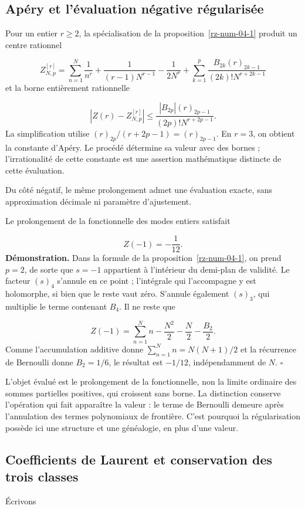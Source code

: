 \subsection{Apéry et l’évaluation négative régularisée}
Pour un entier \(r\geq2\), la spécialisation de la proposition~\ref{rz-num-04-1} produit un centre rationnel

\[
Z_{N,p}^{[r]}=
\sum_{n=1}^N\frac1{n^r}+\frac1{(r-1)N^{r-1}}-\frac1{2N^r}
+\sum_{k=1}^p\frac{B_{2k}(r)_{2k-1}}{(2k)!N^{r+2k-1}}
\]
et la borne entièrement rationnelle

\[
\left|Z(r)-Z_{N,p}^{[r]}\right|
\leq\frac{|B_{2p}|(r)_{2p-1}}{(2p)!N^{r+2p-1}}.
\]
La simplification utilise \((r)_{2p}/(r+2p-1)=(r)_{2p-1}\). En \(r=3\), on obtient la constante d’Apéry. Le procédé détermine sa valeur avec des bornes ; l’irrationalité de cette constante est une assertion mathématique distincte de cette évaluation.

Du côté négatif, le même prolongement admet une évaluation exacte, sans approximation décimale ni paramètre d’ajustement.

Le prolongement de la fonctionnelle des modes entiers satisfait

\[
Z(-1)=-\frac1{12}.
\]
\textbf{Démonstration.} Dans la formule de la proposition~\ref{rz-num-04-1}, on prend \(p=2\), de sorte que \(s=-1\) appartient à l'intérieur du demi-plan de validité. Le facteur \((s)_4\) s'annule en ce point ; l'intégrale qui l'accompagne y est holomorphe, si bien que le reste vaut zéro. S'annule également \((s)_3\), qui multiplie le terme contenant \(B_4\). Il ne reste que

\[
Z(-1)=\sum_{n=1}^N n-\frac{N^2}{2}-\frac N2-\frac{B_2}{2}.
\]
Comme l’accumulation additive donne \(\sum_{n=1}^N n=N(N+1)/2\) et la récurrence de Bernoulli donne \(B_2=1/6\), le résultat est \(-1/12\), indépendamment de \(N\). \hfill\(\square\)

L’objet évalué est le prolongement de la fonctionnelle, non la limite ordinaire des sommes partielles positives, qui croissent sans borne. La distinction conserve l’opération qui fait apparaître la valeur : le terme de Bernoulli demeure après l’annulation des termes polynomiaux de frontière. C’est pourquoi la régularisation possède ici une structure et une généalogie, en plus d’une valeur.

\subsection{Coefficients de Laurent et conservation des trois classes}
Écrivons

